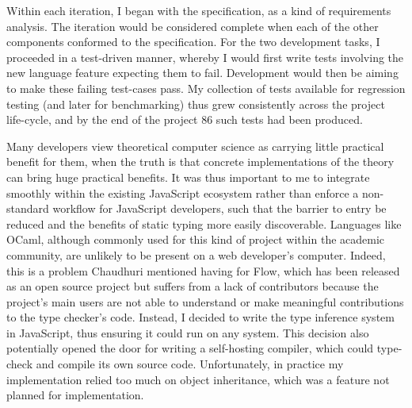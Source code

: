 \documentclass[12pt,a4paper,twoside,openright]{report}
\begin{document}
Within each iteration, I began with the specification, as a kind of
requirements analysis. The iteration would be considered complete when each of
the other components conformed to the specification. For the two development
tasks, I proceeded in a test-driven manner, whereby I would first write tests
involving the new language feature expecting them to fail. Development would
then be aiming to make these failing test-cases pass. My collection of tests
available for regression testing (and later for benchmarking) thus grew
consistently across the project life-cycle, and by the end of the project 86
such tests had been produced.

Many developers view theoretical computer science as carrying little practical
benefit for them, when the truth is that concrete implementations of the theory
can bring huge practical benefits. It was thus important to me to integrate
smoothly within the existing JavaScript ecosystem rather than enforce a
non-standard workflow for JavaScript developers, such that the barrier to entry
be reduced and the benefits of static typing more easily discoverable.
Languages like OCaml, although commonly used for this kind of project within
the academic community, are unlikely to be present on a web developer's
computer. Indeed, this is a problem Chaudhuri mentioned having for Flow, which
has been released as an open source project but suffers from a lack of
contributors because the project's main users are not able to understand or
make meaningful contributions to the type checker's code. Instead, I decided to
write the type inference system in JavaScript, thus ensuring it could run on
any system. This decision also potentially opened the door for writing a
self-hosting compiler, which could type-check and compile its own source code.
Unfortunately, in practice my implementation relied too much on object
inheritance, which was a feature not planned for implementation.
\end{document}
